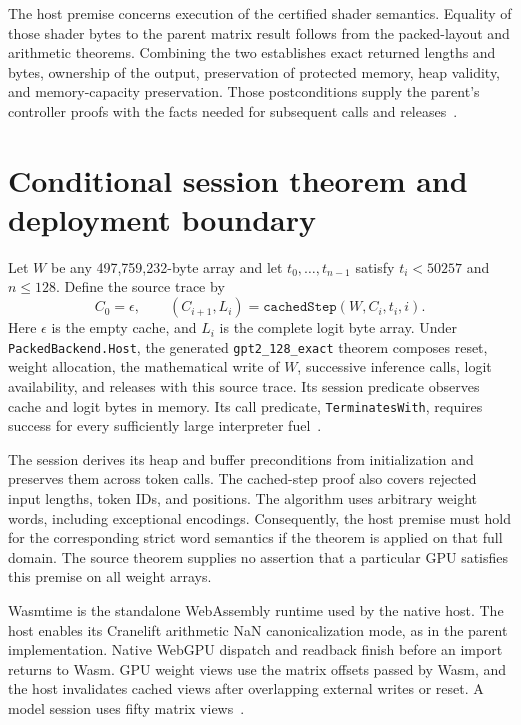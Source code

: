 \documentclass[11pt]{article}
\newcommand{\code}[1]{\texttt{#1}}
\begin{document}
The host premise concerns execution of the certified shader semantics.  Equality of those shader bytes to the parent matrix result follows from the packed-layout and arithmetic theorems.  Combining the two establishes exact returned lengths and bytes, ownership of the output, preservation of protected memory, heap validity, and memory-capacity preservation.  Those postconditions supply the parent's controller proofs with the facts needed for subsequent calls and releases~\cite{packedshader,backend}.

\section{Conditional session theorem and deployment boundary}

Let $W$ be any 497,759,232-byte array and let $t_0,\ldots,t_{n-1}$ satisfy $t_i<50257$ and $n\leq128$.  Define the source trace by
\[
C_0=\epsilon,\qquad (C_{i+1},L_i)=\code{cachedStep}(W,C_i,t_i,i).
\]
Here $\epsilon$ is the empty cache, and $L_i$ is the complete logit byte array.  Under \code{PackedBackend.Host}, the generated \code{gpt2\_128\_exact} theorem composes reset, weight allocation, the mathematical write of $W$, successive inference calls, logit availability, and releases with this source trace.  Its session predicate observes cache and logit bytes in memory.  Its call predicate, \code{TerminatesWith}, requires success for every sufficiently large interpreter fuel~\cite{composition,session}.

The session derives its heap and buffer preconditions from initialization and preserves them across token calls.  The cached-step proof also covers rejected input lengths, token IDs, and positions.  The algorithm uses arbitrary weight words, including exceptional encodings.  Consequently, the host premise must hold for the corresponding strict word semantics if the theorem is applied on that full domain.  The source theorem supplies no assertion that a particular GPU satisfies this premise on all weight arrays.

Wasmtime is the standalone WebAssembly runtime used by the native host.  The host enables its Cranelift arithmetic NaN canonicalization mode, as in the parent implementation.  Native WebGPU dispatch and readback finish before an import returns to Wasm.  GPU weight views use the matrix offsets passed by Wasm, and the host invalidates cached views after overlapping external writes or reset.  A model session uses fifty matrix views~\cite{host}.
\end{document}
